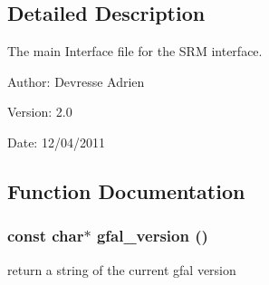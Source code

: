 \subsection{Detailed Description}
The main Interface file for the SRM interface. 

\begin{Desc}
\item[Author:]Devresse Adrien \end{Desc}
\begin{Desc}
\item[Version:]2.0 \end{Desc}
\begin{Desc}
\item[Date:]12/04/2011 \end{Desc}


\subsection{Function Documentation}
\subsubsection{\setlength{\rightskip}{0pt plus 5cm}const char$\ast$ gfal\_\-version ()}\label{gfal__common__interface_8h_a5a8df616e6a5e6fc1d94e2374c7ccf2}


return a string of the current gfal version 
